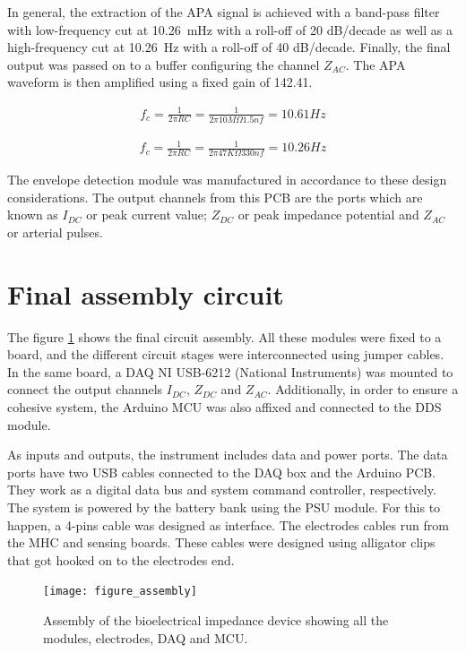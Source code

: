 In general, the extraction of the APA signal is achieved with a band-pass filter with low-frequency cut at \SI{10.26}{\milli\hertz} with a roll-off of \num{20} dB/decade as well as a high-frequency cut at \SI{10.26}{\Hz} with a roll-off of \num{40} dB/decade. Finally, the final output was passed on to a buffer configuring the channel $Z_{AC}$. The APA waveform is then amplified using a fixed gain of \num{142.41}.

\begin{align}
	\label{eg:fc2}
	f_c = \frac{1}{2 \pi R C} = \frac{1}{2 \pi 10M\Omega 1.5 nf}=10.61Hz
\end{align}

\begin{align}
	\label{eg:fc3}
	f_c = \frac{1}{2 \pi R C} = \frac{1}{2 \pi 47K\Omega 330nf}=10.26Hz
\end{align}

The envelope detection module was manufactured in accordance to these design considerations. The output channels from this PCB are the ports which are known as $I_{DC}$ or peak current value; $Z_{DC}$ or peak impedance potential and $Z_{AC}$ or arterial pulses.   

\section{Final assembly circuit}
\label{section design final}
The figure \ref{fig:assembly} shows the final circuit assembly. All these modules were fixed to a board, and the different circuit stages were interconnected using jumper cables. In the same board, a DAQ NI USB-6212 (National Instruments) was mounted to connect the output channels $I_{DC}$, $Z_{DC}$ and $Z_{AC}$. Additionally, in order to ensure a cohesive system, the Arduino MCU was also affixed and connected to the DDS module. 

As inputs and outputs, the instrument includes data and power ports. The data ports have two USB cables connected to the DAQ box and the Arduino PCB. They work as a digital data bus and system command controller, respectively. The system is powered by the battery bank using the PSU module. For this to happen, a 4-pins cable was designed as interface. The electrodes cables run from the MHC and sensing boards. These cables were designed using alligator clips that got hooked on to the electrodes end. 

\begin{figure}[!htpb]
	\centering
	\texttt{[image: figure\_assembly]}
	\caption[Assembly of the bioelectrical impedance device]{Assembly of the bioelectrical impedance device showing all the modules, electrodes, DAQ and MCU.}
	\label{fig:assembly}
\end{figure}

